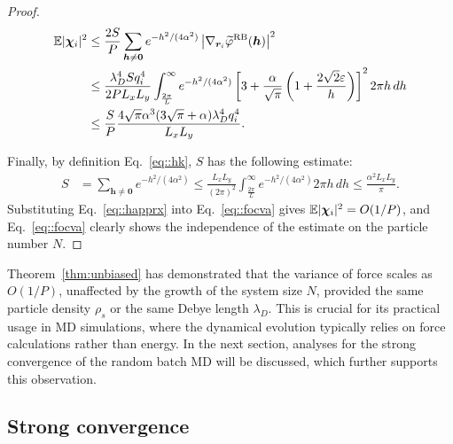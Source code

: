\begin{proof}
	\begin{equation}\label{eq::focva}
		\begin{split}
			\mathbb{E}|\boldsymbol{\chi}_{i}|^2&\leq \frac{2S}{P}\sum_{\bm{h}\neq\bm{0}}e^{-h^2/(4\alpha^2)}\left|\nabla_{\bm{r}_i}\widetilde{\varphi}^{\text{RB}}(\bm{h})\right|^2\\
			&\leq \frac{\lambda_D^4 S q_i^4}{2PL_xL_y} \int_{\frac{2\pi}{L}}^{\infty}e^{-h^2/(4\alpha^2)}\left[3+\frac{\alpha}{\sqrt{\pi}}\left(1+\frac{2\sqrt{2}\varepsilon}{h}\right)\right]^2 2\pi h\,dh\\
			&\leq \frac{S}{P}\frac{4\sqrt{\pi}\alpha^3(3\sqrt{\pi}+\alpha)\lambda_D^4 q_{i}^4}{L_xL_y}.
		\end{split}
	\end{equation}
	
	Finally, by definition Eq.~\eqref{eq::hk}, $S$ has the following estimate:
	\begin{equation}\label{eq::happrx}
		\begin{split}
			S &= \sum_{\bm{h}\neq\bm{0}}e^{-h^2/(4\alpha^2)}\leq \frac{L_xL_y}{(2\pi)^2}\int_{\frac{2\pi}{L}}^{\infty} e^{-h^2/(4\alpha^2)}2\pi h\,dh\leq \frac{\alpha^2L_xL_y}{\pi}.
		\end{split}
	\end{equation}
	Substituting Eq.~\eqref{eq::happrx} into Eq.~\eqref{eq::focva} gives $\mathbb{E}|\boldsymbol{\chi}_{i}|^2=O(1/P)$, and Eq.~\eqref{eq::focva} clearly shows the independence of the estimate on the particle number $N$.
\end{proof}


Theorem~\ref{thm:unbiased} has demonstrated that the variance of force scales as $O(1/P)$, unaffected by the growth of the system size $N$, provided the same particle density $\rho_s$ or the same Debye length $\lambda_D$. 
This is crucial for its practical usage in MD simulations, where the dynamical evolution typically relies on force calculations rather than energy. 
In the next section, analyses for the strong convergence of the random batch MD will be discussed, which further supports this observation.

\subsection{Strong convergence} \label{subsec::convergence}

